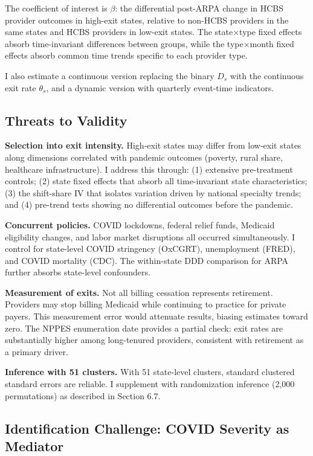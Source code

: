 \documentclass[12pt]{article}
\begin{document}
The coefficient of interest is $\beta$: the differential post-ARPA change in HCBS provider outcomes in high-exit states, relative to non-HCBS providers in the same states and HCBS providers in low-exit states. The state$\times$type fixed effects absorb time-invariant differences between groups, while the type$\times$month fixed effects absorb common time trends specific to each provider type.

I also estimate a continuous version replacing the binary $D_s$ with the continuous exit rate $\theta_s$, and a dynamic version with quarterly event-time indicators.

\subsection{Threats to Validity}

\textbf{Selection into exit intensity.} High-exit states may differ from low-exit states along dimensions correlated with pandemic outcomes (poverty, rural share, healthcare infrastructure). I address this through: (1) extensive pre-treatment controls; (2) state fixed effects that absorb all time-invariant state characteristics; (3) the shift-share IV that isolates variation driven by national specialty trends; and (4) pre-trend tests showing no differential outcomes before the pandemic.

\textbf{Concurrent policies.} COVID lockdowns, federal relief funds, Medicaid eligibility changes, and labor market disruptions all occurred simultaneously. I control for state-level COVID stringency (OxCGRT), unemployment (FRED), and COVID mortality (CDC). The within-state DDD comparison for ARPA further absorbs state-level confounders.

\textbf{Measurement of exits.} Not all billing cessation represents retirement. Providers may stop billing Medicaid while continuing to practice for private payers. This measurement error would attenuate results, biasing estimates toward zero. The NPPES enumeration date provides a partial check: exit rates are substantially higher among long-tenured providers, consistent with retirement as a primary driver.

\textbf{Inference with 51 clusters.} With 51 state-level clusters, standard clustered standard errors are reliable. I supplement with randomization inference (2,000 permutations) as described in Section 6.7.

\subsection{Identification Challenge: COVID Severity as Mediator}
\end{document}
